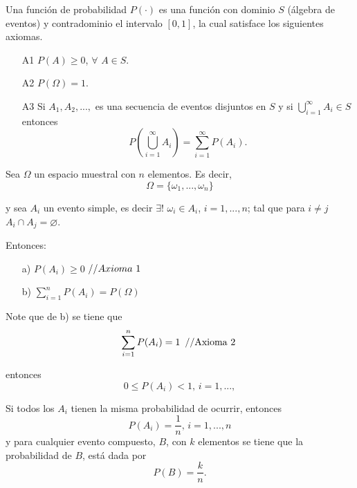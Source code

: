\begin{definition}
Una función de probabilidad $P(\cdot )$ es una función con dominio $S$ (álgebra de eventos) y contradominio el intervalo $[0,1]$, la cual satisface los siguientes axiomas.
\begin{itemize}
    \item[A1] $P(A)\geq 0$, $\forall$ $A\in S$.
    \item[A2] $P(\Omega)=1$.
    \item[A3] Si $A_{1},A_{2},...,$ es una secuencia de eventos disjuntos en $S$ y si $\bigcup\limits_{i=1}^{\infty}A_{i}\in S$ entonces
\begin{equation*}
P\left( \bigcup\limits_{i=1}^{\infty }A_{i}\right) =\sum_{i=1}^{\infty}P(A_{i}).
\end{equation*}
\end{itemize}
\end{definition}

Sea $\Omega$ un espacio muestral con $n$ elementos. Es decir, 
\begin{equation*}
\Omega =\{\omega_{1},...,\omega_{n}\}
\end{equation*}

y sea $A_{i}$ un evento simple, es decir $\exists!$ $\omega _{i}\in A_{i}$, $i=1,...,n$; tal que para $i\neq j$  $A_{i}\cap A_{j}=\varnothing$.

Entonces:
\begin{itemize}
    \item[a)] $P(A_{i})\geq 0$ $\left/ \left/ Axioma\text{ }1\right. \right.$
    \item[b)] $\sum_{i=1}^{n}P(A_{i})=P(\Omega)$
\end{itemize}

Note que de b) se tiene que 
\begin{equation*}
\sum_{i=1}^{n}P(A_{i})=1\text{ }\left/ \left/ \text{Axioma }2\right.
\right.
\end{equation*}

entonces 
\begin{equation*}
0\leq P(A_{i})<1\text{, }i=1,...,
\end{equation*}

Si todos los $A_{i}$ tienen la misma probabilidad de ocurrir, entonces 
\begin{equation*}
P(A_{i})=\frac{1}{n}\text{, }i=1,...,n
\end{equation*}
y para cualquier evento compuesto, $B$, con $k$ elementos se tiene que la probabilidad de $B$, está dada por
\begin{equation*}
P(B)=\frac{k}{n}.
\end{equation*}


